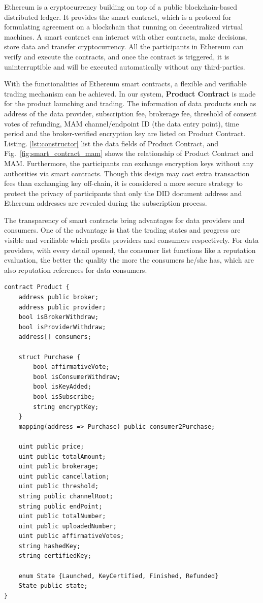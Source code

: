 \documentclass[conference]{IEEEtran}
\begin{document}
Ethereum is a cryptocurrency building on top of a public blockchain-based distributed ledger. It provides the smart contract, which is a protocol for formulating agreement on a blockchain that running on decentralized virtual machines. A smart contract can interact with other contracts, make decisions, store data and transfer cryptocurrency. All the participants in Ethereum can verify and execute the contracts, and once the contract is triggered, it is uninterruptible and will be executed automatically without any third-parties. 

With the functionalities of Ethereum smart contracts, a flexible and verifiable trading mechanism can be achieved. In our system, \textbf{Product Contract} is made for the product launching and trading. The information of data products such as address of the data provider, subscription fee, brokerage fee, threshold of consent votes of refunding, MAM channel/endpoint ID (the data entry point), time period and the broker-verified encryption key are listed on Product Contract. Listing. \ref{lst:constructor} list the data fields of Product Contract, and Fig.~\ref{fig:smart_contract_mam} shows the relationship of Product Contract and MAM. Furthermore, the participants can exchange encryption keys without any authorities via smart contracts. Though this design may cost extra transaction fees than exchanging key off-chain, it is considered a more secure strategy to protect the privacy of participants that only the DID document address and Ethereum addresses are revealed during the subscription process.

The transparency of smart contracts bring advantages for data providers and consumers. One of the advantage is that the trading states and progress are visible and verifiable which profits providers and consumers respectively. For data providers, with every detail opened, the consumer list functions like a reputation evaluation, the better the quality the more the consumers he/she has, which are also reputation references for data consumers.

\lstset{style=solidity}
\begin{lstlisting}[caption={Product Contract data fields}, label={lst:constructor}, frame=single]
contract Product {
    address public broker;
    address public provider;
    bool isBrokerWithdraw;
    bool isProviderWithdraw;
    address[] consumers;
    
    struct Purchase {
        bool affirmativeVote;
        bool isConsumerWithdraw;
        bool isKeyAdded;
        bool isSubscribe;
        string encryptKey;
    }
    mapping(address => Purchase) public consumer2Purchase;
    
    uint public price;
    uint public totalAmount;
    uint public brokerage;
    uint public cancellation;
    uint public threshold;
    string public channelRoot;
    string public endPoint;
    uint public totalNumber;
    uint public uploadedNumber;
    uint public affirmativeVotes;
    string hashedKey;
    string certifiedKey;
    
    enum State {Launched, KeyCertified, Finished, Refunded}
    State public state;
}
\end{lstlisting}
\end{document}
